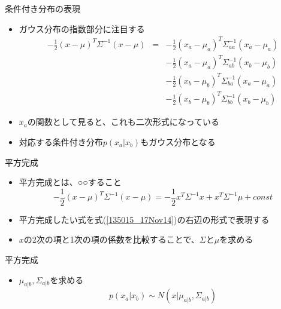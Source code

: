 \begin{frame}{条件付き分布の表現}
\begin{itemize}
 \item ガウス分布の指数部分に注目する
			 \begin{eqnarray*}
				-\frac{1}{2}(x - \mu)^{T}\Sigma^{-1}(x-\mu) &= &
				 -\frac{1}{2}(x_a - \mu_a)^{T}\Sigma_{aa}^{-1}(x_a-\mu_a) \\
				&&-\frac{1}{2}(x_a - \mu_a)^{T}\Sigma_{ab}^{-1}(x_b-\mu_b) \\
				 &&-\frac{1}{2}(x_b - \mu_b)^{T}\Sigma_{ba}^{-1}(x_a-\mu_a) \\
				 &&-\frac{1}{2}(x_b - \mu_b)^{T}\Sigma_{bb}^{-1}(x_b-\mu_b)
			 \end{eqnarray*}
 \item $x_a$の関数として見ると、これも二次形式になっている
 \item 対応する条件付き分布$p(x_a | x_b)$もガウス分布となる
\end{itemize}
\end{frame}

\begin{frame}{平方完成}
\begin{itemize}
 \item 平方完成とは、○○すること %
\begin{equation}
 -\frac{1}{2}(x-\mu)^{T}\Sigma^{-1}(x-\mu) = -\frac{1}{2}x^T\Sigma^{-1}x+x^T\Sigma^{-1}\mu + const\label{135015_17Nov14}
\end{equation}
 \item 平方完成したい式を式(\ref{135015_17Nov14})の右辺の形式で表現する
 \item $x$の2次の項と1次の項の係数を比較することで、$\Sigma$と$\mu$を求める
\end{itemize}
\end{frame}

\begin{frame}{平方完成}
\begin{itemize}
  \item $\mu_{a|b}, \Sigma_{a|b}$を求める
				\begin{equation}
					p(x_a | x_b) \sim N(x | \mu_{a|b}, \Sigma_{a|b})
					\end{equation}
\end{itemize}
\end{frame}

